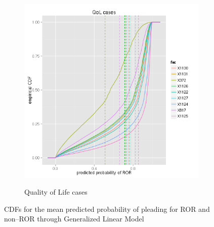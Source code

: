 \begin{figure}
\begin{subfigure}[b]{0.49\textwidth}
    \label{fig:ROR_non--QoL_GLM}
  \end{subfigure}
  ~
  \begin{subfigure}[b]{0.49\textwidth}
    \caption{Quality of Life cases}
    \includegraphics[width=\textwidth]{figures/glmplots/rorq_cdf.png}
    \label{fig:ROR_QoL_GLM}
  \end{subfigure}
  \caption{CDFs for the mean predicted probability of pleading for ROR and non--ROR through Generalized Linear Model}
\end{figure}


